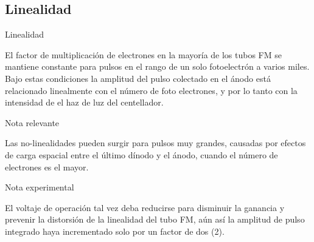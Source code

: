 \documentclass[a4paper,10pt]{beamer}
\begin{document}
\subsection{Linealidad}
\begin{frame}{Linealidad}
 
  \begin{justify}
  El factor de multiplicación de electrones en la mayoría de los tubos FM se mantiene 
  constante para pulsos en el rango de un solo fotoelectrón a varios miles. Bajo estas 
  condiciones la amplitud del pulso colectado en el ánodo está relacionado linealmente 
  con el número de foto electrones, y por lo tanto con la intensidad de el haz de 
  luz del centellador.
  \end{justify}
  
  \begin{block}{Nota relevante}
  \begin{justify}
   Las no-linealidades pueden surgir para pulsos muy grandes, causadas por efectos 
   de carga espacial entre el último dínodo y el ánodo, cuando el número de electrones 
   es el mayor.
   \end{justify}
  \end{block}
  
  \begin{exampleblock}{Nota experimental}
   \begin{justify}
    El voltaje de operación tal vez deba reducirse para disminuir la ganancia y prevenir 
    la distorsión de la linealidad del tubo FM, aún así la amplitud de pulso integrado 
    haya incrementado solo por un factor de dos (2).
   \end{justify}
  \end{exampleblock}
 
\end{frame}
\end{document}
